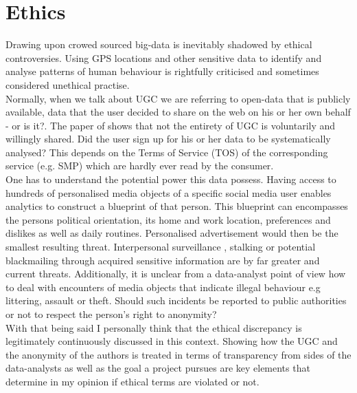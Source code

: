 \section{Ethics}
Drawing upon crowed sourced big-data is inevitably shadowed by ethical controversies. Using GPS locations and other sensitive data to identify and analyse patterns of human behaviour is rightfully criticised and sometimes considered unethical practise.\\
Normally, when we talk about UGC we are referring to open-data that is publicly available, data that the user decided to share on the web on his or her own behalf - or is it?. The paper of \textcite{Estima2016} shows that not the entirety of UGC is voluntarily and willingly shared. Did the user sign up for his or her data to be systematically analysed? This depends on the Terms of Service (TOS) of the corresponding service (e.g. SMP) which are hardly ever read by the consumer.\\
One has to understand the potential power this data possess. Having access to hundreds of personalised media objects of a specific social media user enables analytics to construct a blueprint of that person. This blueprint can encompasses the persons political orientation, its home and work location, preferences and dislikes as well as daily routines. Personalised advertisement would then be the smallest resulting threat. Interpersonal surveillance \parencite{Trottier2017}, stalking \parencite{Lyndon2011} or potential blackmailing through acquired sensitive information are by far greater and current threats. Additionally, it is unclear from a data-analyst point of view how to deal with encounters of media objects that indicate illegal behaviour e.g littering, assault or theft. Should such incidents be reported to public authorities or not to respect the person's right to anonymity?\\

With that being said I personally think that the ethical discrepancy is legitimately continuously discussed in this context. Showing how the UGC and the anonymity of the authors is treated in terms of transparency from sides of the data-analysts as well as the goal a project pursues are key elements that determine in my opinion if ethical terms are violated or not. 






